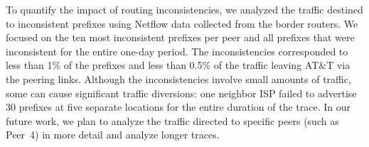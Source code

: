 To quantify the impact of routing inconsistencies, we analyzed the
traffic destined to inconsistent prefixes using Netflow data collected
from the border routers.  We focused on the ten most inconsistent
prefixes per peer and all prefixes that were inconsistent for the entire
one-day period.  The inconsistencies corresponded to less than 1\% of
the prefixes and less than 0.5\% of the traffic leaving AT\&T via the
peering links.  
Although the inconsistencies involve small amounts of
traffic, some can cause significant traffic diversions: one neighbor ISP
failed to advertise 30 prefixes at five separate locations for the
entire duration of the trace.  
In our future work, we plan to analyze the traffic
directed to specific peers (such as Peer~4) in more detail and
analyze longer traces.  
%

